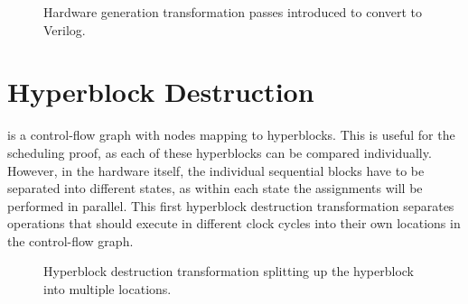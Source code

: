 \begin{figure*}
  \caption{Hardware generation transformation passes introduced to convert
    \rtlpar{} to Verilog.}%
  \label{fig:hg:vericert-hardware-generation}
\end{figure*}

\section{Hyperblock Destruction}%
\label{sec:hg:hyperblock-destruction}

\rtlpar{} is a control-flow graph with nodes mapping to hyperblocks.  This is
useful for the scheduling proof, as each of these hyperblocks can be compared
individually.  However, in the hardware itself, the individual sequential blocks
have to be separated into different states, as within each state the
assignments will be performed in parallel.  This first hyperblock destruction
transformation separates operations that should execute in different clock
cycles into their own locations in the control-flow graph.

\begin{figure}
  \centering
  \caption{Hyperblock destruction transformation splitting up the hyperblock into
    multiple locations.}%
  \label{fig:hg:hyperblock-destruction}
\end{figure}

